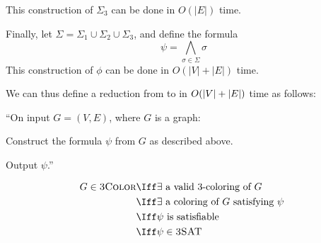 \begin{Answer}
\begin{enumroman}
      \step
      This construction of $\Sigma_3$ can be done in $O(|E|)$ time.
  \end{enumroman}

  \step
  Finally, let $\Sigma = \Sigma_1 \cup \Sigma_2 \cup \Sigma_3$,
  and define the formula
  \[
    \psi = \bigwedge_{\sigma \in \Sigma} \sigma
  \]
  This construction of $\phi$ can be done in $O(|V| + |E|)$ time.

  \step
  We can thus define a reduction from \TColor to \TSAT in
    $O(\lvert V\rvert + \lvert E\rvert)$ time as follows:

  \step
  ``On input $G = (V, E)$, where $G$ is a graph:
  \begin{enumarabic}
    \item Construct the formula $\psi$ from $G$ as described above.
    \item Output $\psi$.''
  \end{enumarabic}

  \step
  \begin{align*}
    G \in \TColor &\Iff \exists \text{ a valid $3$-coloring of $G$ } \\
    &\Iff \exists \text{ a coloring of $G$ satisfying $\psi$ } \\
    &\Iff \psi \text{ is satisfiable } \\
    &\Iff \psi \in \TSAT
  \end{align*}


\end{Answer}
